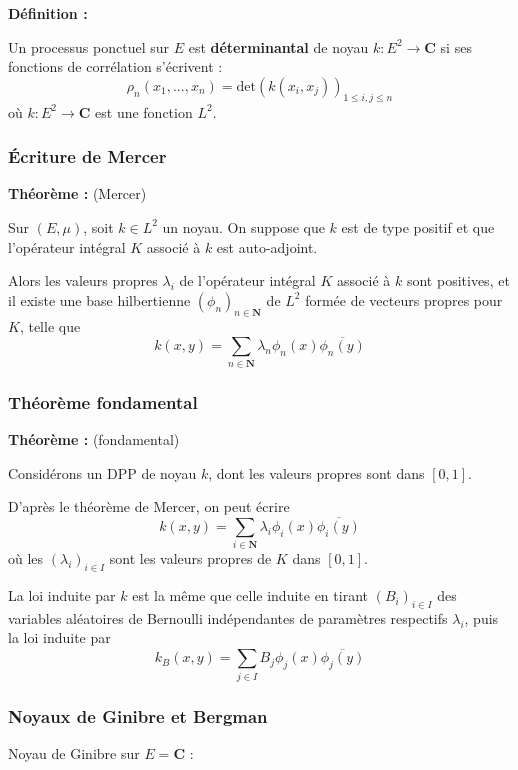 \documentclass{beamer}
\begin{document}
\begin{frame}
    \textbf{Définition :}

    Un processus ponctuel sur $E$ est \textbf{déterminantal} de noyau $k : E^2 \to \mathbf C$ si ses fonctions de corrélation s'écrivent :
    \[
        \rho_n(x_1,...,x_n) = \mathrm{det}(k(x_i,x_j))_{1 \leqslant i,j \leqslant n}
    \]
    où $ k : E^2 \to \mathbf C $ est une fonction $L^2$.

\end{frame}\begin{frame}\frametitle{Écriture de Mercer}

    \textbf{Théorème :} (Mercer)

    \bigskip

    Sur $ (E, \mu) $, soit $ k \in L^2 $ un noyau. On suppose que $k$ est de type positif et que l'opérateur intégral $K$ associé à $k$ est auto-adjoint.

    \bigskip

    Alors les valeurs propres $ \lambda_i $ de l'opérateur intégral $K$ associé à $k$ sont positives, et il existe une base hilbertienne $(\phi_n)_{n\in\mathbf N}$ de $L^2$ formée de vecteurs propres pour $K$, telle que 
    \[
        k(x,y) = \sum_{n \in \mathbf N} \lambda_n \phi_n(x) \overline{\phi_n(y)} 
    \]

\end{frame}\begin{frame}\frametitle{Théorème fondamental}

    \textbf{Théorème :} (fondamental)

    Considérons un DPP de noyau $k$, dont les valeurs propres sont dans $[0,1]$.

    D'après le théorème de Mercer, on peut écrire 
    \[ 
        k(x,y) = \sum_{i \in \mathbf N} \lambda_i \phi_i (x) \overline{\phi_i(y)}
    \] 
    où les $ (\lambda_i)_{i \in I} $ sont les valeurs propres de $K$ dans $[0,1]$.

    \bigskip

    La loi induite par $k$ est la même que celle induite en tirant $ (B_i)_{i \in I} $ des variables aléatoires de Bernoulli indépendantes de paramètres respectifs $ \lambda_i $, puis la loi induite par 
    \[
         k_B(x,y) = \sum_{j \in I} B_j \phi_j(x) \overline{\phi_j(y)}
    \]

\end{frame}\begin{frame}\frametitle{Noyaux de Ginibre et Bergman}

    \bigskip

    Noyau de Ginibre sur $ E = \mathbf C $ : 
    

\end{frame}
\end{document}
